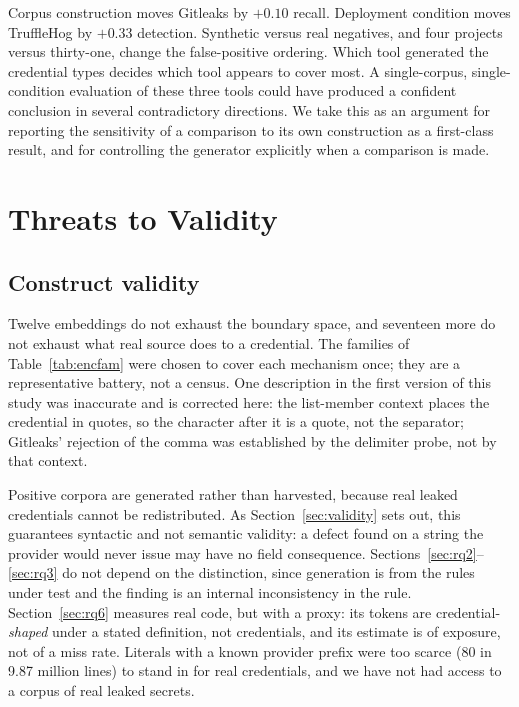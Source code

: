 \documentclass[pdflatex,sn-basic]{sn-jnl}
\begin{document}
Corpus construction moves Gitleaks by $+0.10$ recall. Deployment condition moves TruffleHog by $+0.33$ detection. Synthetic versus real negatives, and four projects versus thirty-one, change the false-positive ordering. Which tool generated the credential types decides which tool appears to cover most. A single-corpus, single-condition evaluation of these three tools could have produced a confident conclusion in several contradictory directions. We take this as an argument for reporting the sensitivity of a comparison to its own construction as a first-class result, and for controlling the generator explicitly when a comparison is made.

\section{Threats to Validity}
\label{sec:threats}

\subsection{Construct validity}

Twelve embeddings do not exhaust the boundary space, and seventeen more do not exhaust what real source does to a credential. The families of Table~\ref{tab:encfam} were chosen to cover each mechanism once; they are a representative battery, not a census. One description in the first version of this study was inaccurate and is corrected here: the list-member context places the credential in quotes, so the character after it is a quote, not the separator; Gitleaks' rejection of the comma was established by the delimiter probe, not by that context.

Positive corpora are generated rather than harvested, because real leaked credentials cannot be redistributed. As Section~\ref{sec:validity} sets out, this guarantees syntactic and not semantic validity: a defect found on a string the provider would never issue may have no field consequence. Sections~\ref{sec:rq2}--\ref{sec:rq3} do not depend on the distinction, since generation is from the rules under test and the finding is an internal inconsistency in the rule. Section~\ref{sec:rq6} measures real code, but with a proxy: its tokens are credential-\emph{shaped} under a stated definition, not credentials, and its estimate is of exposure, not of a miss rate. Literals with a known provider prefix were too scarce (80 in 9.87 million lines) to stand in for real credentials, and we have not had access to a corpus of real leaked secrets.
\end{document}
